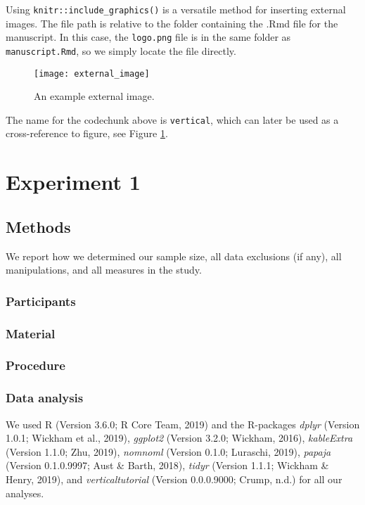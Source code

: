 \documentclass[
  english,
  man,floatsintext]{apa6}
\begin{document}
Using \texttt{knitr::include\_graphics()} is a versatile method for inserting external images. The file path is relative to the folder containing the .Rmd file for the manuscript. In this case, the \texttt{logo.png} file is in the same folder as \texttt{manuscript.Rmd}, so we simply locate the file directly.

\begin{figure}
\texttt{[image: external\_image]} \caption{An example external image.}\label{fig:vertical}
\end{figure}

The name for the codechunk above is \texttt{vertical}, which can later be used as a cross-reference to figure, see Figure \ref{fig:vertical}.

\hypertarget{experiment-1}{%
\section{Experiment 1}\label{experiment-1}}

\hypertarget{methods}{%
\subsection{Methods}\label{methods}}

We report how we determined our sample size, all data exclusions (if any), all manipulations, and all measures in the study.

\hypertarget{participants}{%
\subsubsection{Participants}\label{participants}}

\hypertarget{material}{%
\subsubsection{Material}\label{material}}

\hypertarget{procedure}{%
\subsubsection{Procedure}\label{procedure}}

\hypertarget{data-analysis}{%
\subsubsection{Data analysis}\label{data-analysis}}

We used R (Version 3.6.0; R Core Team, 2019) and the R-packages \emph{dplyr} (Version 1.0.1; Wickham et al., 2019), \emph{ggplot2} (Version 3.2.0; Wickham, 2016), \emph{kableExtra} (Version 1.1.0; Zhu, 2019), \emph{nomnoml} (Version 0.1.0; Luraschi, 2019), \emph{papaja} (Version 0.1.0.9997; Aust \& Barth, 2018), \emph{tidyr} (Version 1.1.1; Wickham \& Henry, 2019), and \emph{verticaltutorial} (Version 0.0.0.9000; Crump, n.d.) for all our analyses.
\end{document}
